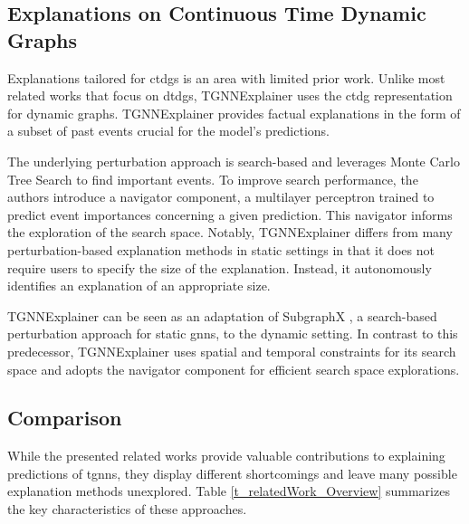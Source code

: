 \subsection{Explanations on Continuous Time Dynamic Graphs}
\label{s_relatedWork_CTDG}

Explanations tailored for \glspl{ctdg} is an area with limited prior work. Unlike most related works that focus on \glspl{dtdg}, TGNNExplainer \cite{xia_explaining_2023} uses the \gls{ctdg} representation for dynamic graphs. TGNNExplainer provides factual explanations in the form of a subset of past events crucial for the model's predictions.

The underlying perturbation approach is search-based and leverages Monte Carlo Tree Search to find important events. To improve search performance, the authors introduce a navigator component, a multilayer perceptron trained to predict event importances concerning a given prediction. This navigator informs the exploration of the search space. Notably, TGNNExplainer differs from many perturbation-based explanation methods in static settings in that it does not require users to specify the size of the explanation. Instead, it autonomously identifies an explanation of an appropriate size.

TGNNExplainer can be seen as an adaptation of SubgraphX \cite{yuan_explainability_2021}, a search-based perturbation approach for static \glspl{gnn}, to the dynamic setting. In contrast to this predecessor, TGNNExplainer uses spatial and temporal constraints for its search space and adopts the navigator component for efficient search space explorations.



\subsection{Comparison}
\label{s_relateWork_comparison}

While the presented related works provide valuable contributions to explaining predictions of \glspl{tgnn}, they display different shortcomings and leave many possible explanation methods unexplored. Table \ref{t_relatedWork_Overview} summarizes the key characteristics of these approaches. 

